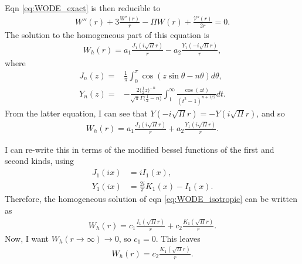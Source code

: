 \documentclass{article}
\begin{document}
Eqn \ref{eq:WODE_exact} is then reducible to
\begin{align}\label{eq:WODE_isotropic}
  W''(r)+3\frac{W'(r)}{r}-\Pi W(r)+\frac{\mathcal{V}'(r)}{2r}=0.
\end{align}
The solution to the homogeneous part of this equation
is
\begin{align}
  W_h(r)=a_1\frac{J_1(i\sqrt{\Pi}r)}{r}-a_2\frac{Y_1(-i\sqrt{\Pi}r)}{r},
\end{align}
where
\begin{align}
  J_n(z) =& \frac{1}{\pi}\int_0^{\pi}\cos(z\sin\theta-n\theta)d\theta,\\
  Y_n(z) =& -\frac{2\bigg(\frac{1}{2}z\bigg)^{-n}}{\sqrt{\pi}\Gamma\bigg(\frac{1}{2}-n\bigg)}
            \int_1^{\infty}\frac{\cos(zt)}{(t^2-1)^{n+1/2}}dt.
\end{align}
From the latter equation, I can see that $Y(-i\sqrt{\Pi}r)=-Y(i\sqrt{\Pi}r)$, and so
\begin{align}
  W_h(r)=a_1\frac{J_1(i\sqrt{\Pi}r)}{r}+a_2\frac{Y_1(i\sqrt{\Pi}r)}{r}.
\end{align}

I can re-write this in terms of the modified bessel functions of the first and second kinds,
using
\begin{align}
  J_1(ix) &= i I_1(x),\\
  Y_1(ix) &= \frac{2i}{\pi}K_1(x)-I_1(x).
\end{align}
Therefore, the homogeneous solution of eqn \ref{eq:WODE_isotropic} can be written as
\begin{align}
  W_h(r) = c_1\frac{I_1(\sqrt{\Pi}r)}{r} + c_2\frac{K_1(\sqrt{\Pi}r)}{r}.
\end{align}
Now, I want $W_h(r\to\infty)\to0$, so $c_1=0$. This leaves
\begin{align}\label{eq:Whomo}
  W_h(r) = c_2\frac{K_1(\sqrt{\Pi}r)}{r}.
\end{align}
  


\begin{comment}
The second option is to say that, within the sum over the index $k$ in eqn
\ref{eq:WODE_exact}, the terms are essentially averaging out to zero unless $k=j$,
so
\begin{align}
  \bm{r}_{ik}\cdot\bm{u}_{ij}&\approx\delta_{jk}\bm{r}_{ik}\cdot\bm{u}_{ij},\\
  \bm{r}_{ik}\cdot\bm{r}_{ik}&\approx\delta_{jk}\bm{r}_{ik}\cdot\bm{r}_{ij}.
\end{align}
Inserting this approximation into eqn \ref{eq:WODE_exact} then yields
\begin{align}
  W''(r)+W'(r)\bigg(\frac{3}{r}-\mathcal{V}'(r)\bigg)-\bigg(\Pi
  + \frac{\mathcal{V}'(r)}{r}\bigg) W(r)+\frac{\mathcal{V}'(r)}{2r}=0.
\end{align}
\end{comment}
\end{document}
